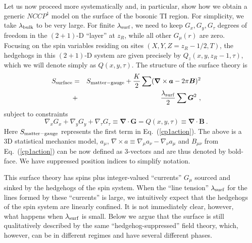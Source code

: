 \documentclass[prb,twocolumn]{revtex4-1}
\begin{document}
Let us now proceed more systematically and, in particular, show how we obtain a generic $NCCP^1$ model on the surface of the bosonic TI region.  For simplicity, we take $\lambda_{\rm bulk}$ to be very large. For finite $\lambda_{\rm surf}$, we need to keep $G_x, G_y, G_\tau$ degrees of freedom in the $(2+1)$-D ``layer'' at $z_R$, while all other $G_\mu(r)$ are zero.  Focusing on the spin variables residing on sites $(X, Y, Z=z_R-1/2, T)$, the hedgehogs in this $(2+1)$-D system are given precisely by $Q_z(x, y, z_R-1, \tau)$, which we will denote simply as $Q(x, y, \tau)$.  The structure of the surface theory is
\begin{eqnarray}
S_{\rm surface} &=& S_{\rm matter-gauge} + \frac{K}{2}\sum  ({\bm\nabla} \times {\bm a} - 2\pi {\bm B})^2\nonumber \\
&+& \frac{\lambda_{\rm surf}}{2}\sum  {\bm G}^2 ~,
\label{lesikeqn}
\end{eqnarray}
subject to constraints
\begin{equation}
 \nabla_x G_x + \nabla_y G_y + \nabla_\tau G_\tau \equiv {\bm \nabla} \cdot {\bm G} = Q(x,y,\tau) \equiv {\bm \nabla} \cdot {\bm B} ~.
\end{equation}
Here $S_{\rm matter-gauge}$ represents the first term in Eq.~(\ref{cp1action}). The above is a 3D statistical mechanics model, $a_\mu$, $\nabla\times a\equiv \nabla_\mu a_\nu -\nabla_\nu a_\mu$ and $B_{\mu\nu}$ from Eq.~(\ref{cp1action}) can be now defined as 3-vectors and are thus denoted by bold-face. We have suppressed position indices to simplify notation.

This surface theory has spins plus integer-valued ``currents'' $G_\mu$ sourced and sinked by the hedgehogs of the spin system.  When the ``line tension'' $\lambda_{\rm surf}$ for the lines formed by these ``currents'' is large, we intuitively expect that the hedgehogs of the spin system are linearly confined.  It is not immediately clear, however, what happens when $\lambda_{\rm surf}$ is small.  Below we argue that the surface is still qualitatively described by the same ``hedgehog-suppressed'' field theory, which, however, can be in different regimes and have several different phases.
\end{document}
